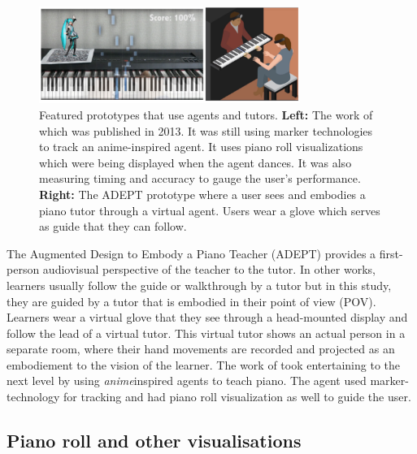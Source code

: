 \documentclass[sigchi, review]{acmart}
\begin{document}
\begin{figure}[t]
    \centering
    \includegraphics[width=8.5cm]{figures/goodwingerry.png}
    \caption{Featured prototypes that use agents and tutors. \textbf{Left:} The work of \cite{goodwin2013key} which was published in 2013. It was still using marker technologies to track an anime-inspired agent. It uses piano roll visualizations which were being displayed when the agent dances. It was also measuring timing and accuracy to gauge the user's performance.  \textbf{Right:} The ADEPT prototype \cite{gerry2019adept} where a user sees and embodies a piano tutor through a virtual agent. Users wear a glove which serves as guide that they can follow. }
    \label{fig:goodwingerry}
\end{figure}

The Augmented Design to Embody a Piano Teacher (ADEPT) \cite{gerry2019adept} provides a first-person audiovisual perspective of the teacher to the tutor. In other works, learners usually follow the guide or walkthrough by a tutor but in this study, they are guided by a tutor that is embodied in their point of view (POV). Learners wear a virtual glove that they see through a head-mounted display and follow the lead of a virtual tutor. This virtual tutor shows an actual person in a separate room, where their hand movements are recorded and projected as an embodiement to the vision of the learner. The work of \cite{goodwin2013key} took entertaining to the next level by using \textit{anime}\textendash inspired agents to teach piano. The agent used marker-technology for tracking and had piano roll visualization as well to guide the user. 

\subsection{Piano roll and other visualisations}
\label{subsec: viz}
\end{document}
